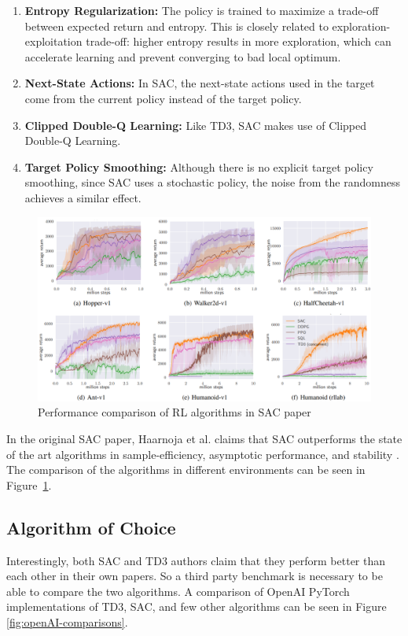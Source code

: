 \documentclass[12pt,twoside]{report}
\begin{document}
\begin{enumerate}
  \item \textbf{Entropy Regularization:} The policy is trained to maximize a trade-off between expected return and entropy. This is closely related to exploration-exploitation trade-off: higher entropy results in more exploration, which can accelerate learning and prevent converging to bad local optimum.
  \item \textbf{Next-State Actions:} In SAC, the next-state actions used in the target come from the current policy instead of the target policy.
  \item \textbf{Clipped Double-Q Learning:} Like TD3, SAC makes use of Clipped Double-Q Learning.
  \item \textbf{Target Policy Smoothing:} Although there is no explicit target policy smoothing, since SAC uses a stochastic policy, the noise from the randomness achieves a similar effect.
\end{enumerate}

\begin{figure}[h]
\centering
\includegraphics[width = \hsize]{figures/sac comparison og.png}
\caption{Performance comparison of RL algorithms in SAC paper \cite{sacOG}}
\label{fig:sac-comparisons}
\end{figure}

In the original SAC paper, Haarnoja et al. claims that SAC outperforms the state of the art algorithms in sample-efficiency, asymptotic performance, and stability \cite{sacOG}. The comparison of the algorithms in different environments can be seen in Figure~\ref{fig:sac-comparisons}.

\subsection{Algorithm of Choice}
Interestingly, both SAC and TD3 authors claim that they perform better than each other in their own papers. So a third party benchmark is necessary to be able to compare the two algorithms. A comparison of OpenAI PyTorch implementations of TD3, SAC, and few other algorithms can be seen in Figure \ref{fig:openAI-comparisons}.
\end{document}
